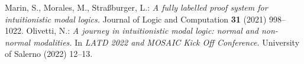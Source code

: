 \documentclass[draft]{article}
\begin{document}
\begin{thebibliography}{}
%
%
%
%
%
%
Marin, S., Morales, M., Stra\ss burger, L.:
{\it A fully labelled proof system for intuitionistic modal logics.}
Journal of Logic and Computation {\bf 31} (2021) 998--1022.
%
%
%
%
%
%
%
%
%
%
%
%
%
%
Olivetti, N.:
{\it A journey in intuitionistic modal logic: normal and non-normal modalities.}
In {\it LATD 2022 and MOSAIC Kick Off Conference.}
University of Salerno (2022) 12--13.
%
%
%
%
%
%
%
%

\end{thebibliography}
\end{document}
